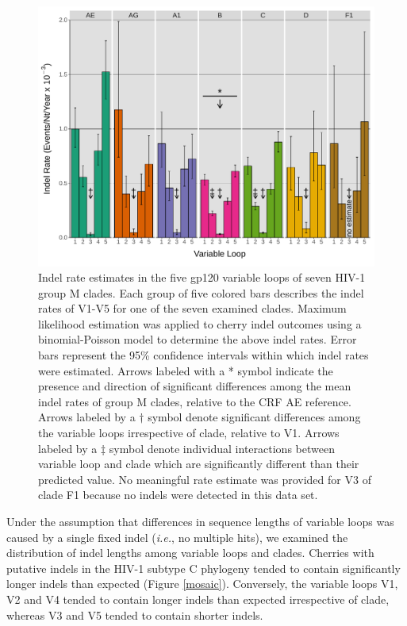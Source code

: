\documentclass[12pt]{article}
\begin{document}
\begin{figure}[htbp]
    \centering
    \includegraphics[width=.85\textwidth]{indel-rates}
    \caption{ 
    Indel rate estimates in the five gp120 variable loops of seven HIV-1 group M clades. 
    Each group of five colored bars describes the indel rates of V1-V5 for one of the seven examined clades. 
    Maximum likelihood estimation was applied to cherry indel outcomes using a binomial-Poisson model to determine the above indel rates. 
    Error bars represent the 95\% confidence intervals within which indel rates were estimated. 
    Arrows labeled with a * symbol indicate the presence and direction of significant differences among the mean indel rates of group M clades, relative to the CRF AE reference. 
    Arrows labeled by a $\dagger$ symbol denote significant differences among the variable loops irrespective of clade, relative to V1.  
    Arrows labeled by a $\ddagger$ symbol denote individual interactions between variable loop and clade which are significantly different than their predicted value.
    No meaningful rate estimate was provided for V3 of clade F1 because no indels were detected in this data set.   
    }
    \label{indel-rates}
\end{figure}




Under the assumption that differences in sequence lengths of variable loops was caused by a single fixed indel (\textit{i.e.}, no multiple hits), we examined the distribution of indel lengths among variable loops and clades.
Cherries with putative indels in the HIV-1 subtype C phylogeny tended to contain significantly longer indels than expected (Figure \ref{mosaic}).
Conversely, the variable loops V1, V2 and V4 tended to contain longer indels than expected irrespective of clade, whereas V3 and V5 tended to contain shorter indels.
\end{document}
